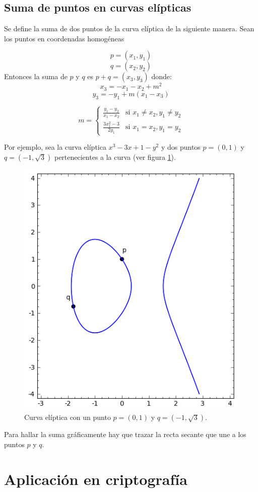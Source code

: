 \documentclass[a4,12pt]{article}
\begin{document}
\subsection{Suma de puntos en curvas elípticas}

Se define la suma de dos puntos de la curva elíptica de la siguiente manera. Sean los puntos en coordenadas homogéneas

$$p=(x_1,y_1)$$ $$ q=(x_2,y_2)$$ 
Entonces la suma de $p$ y $q$ es $ p+q=(x_3,y_3)$ donde: $$ x_3=-x_1-x_2+m^2 $$ $$ y_3=-y_1+m(x_1-x_3) $$

$$ m=
\left\{
	\begin{array}{ll}
		\frac{y_1-y_2}{x_1-x_2}  & \mbox{si } x_1\neq x_2,y_1\neq y_2  \\
		\frac{3x_1^2-3}{2y_1} & \mbox{si }  x_1=x_2,y_1=y_2
	\end{array}
\right.
$$

Por ejemplo, sea la curva elíptica $x^3-3x+1-y^2$ y dos puntos $p=(0,1)$ y $q=(-1,\sqrt{3})$ pertenecientes a la curva (ver figura \ref{fig:sumapuntos}).

\begin{figure}[h]
\begin{center}
\includegraphics[width=.5\linewidth]{imagenes/sumapuntos}
\end{center}
\caption{Curva elíptica con un punto $p=(0,1)$ y $q=(-1,\sqrt{3})$.}
\label{fig:sumapuntos}
\end{figure}

Para hallar la suma gráficamente hay que trazar la recta secante que une a los puntos $p$ y $q$.

\section{Aplicación en criptografía}


\end{document}
